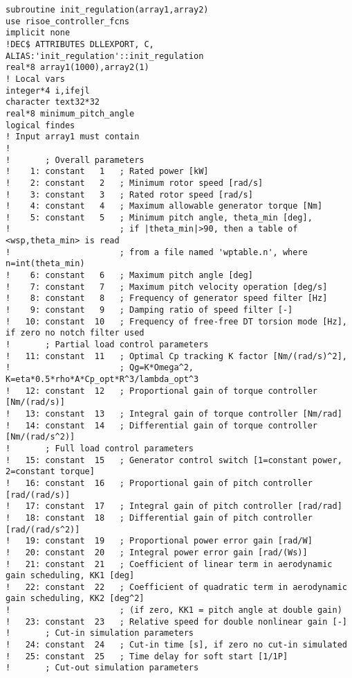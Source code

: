 {\scriptsize
\begin{verbatim}
subroutine init_regulation(array1,array2)
use risoe_controller_fcns
implicit none
!DEC$ ATTRIBUTES DLLEXPORT, C, ALIAS:'init_regulation'::init_regulation
real*8 array1(1000),array2(1)
! Local vars
integer*4 i,ifejl
character text32*32
real*8 minimum_pitch_angle
logical findes
! Input array1 must contain
!
!       ; Overall parameters
!    1: constant   1   ; Rated power [kW]
!    2: constant   2   ; Minimum rotor speed [rad/s]
!    3: constant   3   ; Rated rotor speed [rad/s]
!    4: constant   4   ; Maximum allowable generator torque [Nm]
!    5: constant   5   ; Minimum pitch angle, theta_min [deg],
!                      ; if |theta_min|>90, then a table of <wsp,theta_min> is read
!                      ; from a file named 'wptable.n', where n=int(theta_min)
!    6: constant   6   ; Maximum pitch angle [deg]
!    7: constant   7   ; Maximum pitch velocity operation [deg/s]
!    8: constant   8   ; Frequency of generator speed filter [Hz]
!    9: constant   9   ; Damping ratio of speed filter [-]
!   10: constant  10   ; Frequency of free-free DT torsion mode [Hz], if zero no notch filter used
!       ; Partial load control parameters
!   11: constant  11   ; Optimal Cp tracking K factor [Nm/(rad/s)^2],
!                      ; Qg=K*Omega^2, K=eta*0.5*rho*A*Cp_opt*R^3/lambda_opt^3
!   12: constant  12   ; Proportional gain of torque controller [Nm/(rad/s)]
!   13: constant  13   ; Integral gain of torque controller [Nm/rad]
!   14: constant  14   ; Differential gain of torque controller [Nm/(rad/s^2)]
!       ; Full load control parameters
!   15: constant  15   ; Generator control switch [1=constant power, 2=constant torque]
!   16: constant  16   ; Proportional gain of pitch controller [rad/(rad/s)]
!   17: constant  17   ; Integral gain of pitch controller [rad/rad]
!   18: constant  18   ; Differential gain of pitch controller [rad/(rad/s^2)]
!   19: constant  19   ; Proportional power error gain [rad/W]
!   20: constant  20   ; Integral power error gain [rad/(Ws)]
!   21: constant  21   ; Coefficient of linear term in aerodynamic gain scheduling, KK1 [deg]
!   22: constant  22   ; Coefficient of quadratic term in aerodynamic gain scheduling, KK2 [deg^2]
!                      ; (if zero, KK1 = pitch angle at double gain)
!   23: constant  23   ; Relative speed for double nonlinear gain [-]
!       ; Cut-in simulation parameters
!   24: constant  24   ; Cut-in time [s], if zero no cut-in simulated
!   25: constant  25   ; Time delay for soft start [1/1P]
!       ; Cut-out simulation parameters

\end{verbatim}}
